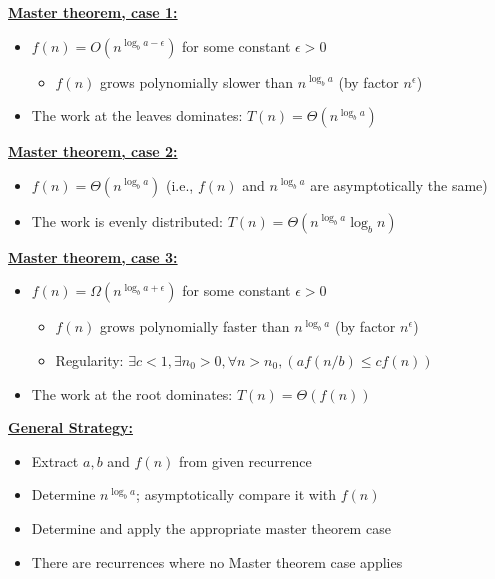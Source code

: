 \textbf{\underline{Master theorem, case 1:}} 
\begin{itemize}
    \item $f(n)=O(n^{\log_ba-\epsilon})$ for some constant $\epsilon>0$
    \begin{itemize}
        \item $f(n)$ grows polynomially slower than $n^{\log_b a}$ (by factor $n^\epsilon$)
    \end{itemize}
    \item The work at the leaves dominates: $T(n)= \Theta(n^{\log_ba})$
\end{itemize}


 
\textbf{\underline{Master theorem, case 2:}} 
\begin{itemize}
    \item $f(n)=\Theta(n^{\log_b a})$ (i.e., $f(n)$ and $n^{\log_b a}$ are asymptotically the same)
    \item The work is evenly distributed: $T(n)=\Theta(n^{\log_b a} \log_b n)$
\end{itemize}



\textbf{\underline{Master theorem, case 3:}} 
\begin{itemize}
    \item $f(n)=\Omega(n^{\log_b a + \epsilon})$ for some constant $\epsilon>0$
    \begin{itemize}
        \item $f(n)$ grows polynomially faster than $n^{\log_b a}$ (by factor $n^\epsilon$)
        \item Regularity: $\exists c < 1, \exists n_0 > 0, \forall n > n_0, (af(n/b) \leq cf(n))$
    \end{itemize}
    \item The work at the root dominates: $T(n) = \Theta(f(n))$
\end{itemize}

\textbf{\underline{General Strategy:}}
\begin{itemize}
    \item Extract $a,b$ and $f(n)$ from given recurrence
    \item Determine $n^{\log_b a}$; asymptotically compare it with $f(n)$
    \item Determine and apply the appropriate master theorem case
    \item There are recurrences where no Master theorem case applies
\end{itemize}
